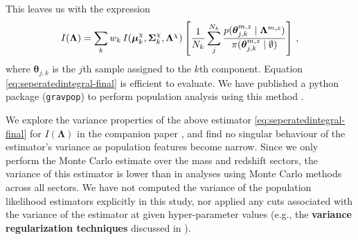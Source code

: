 \documentclass[twocolumn,usenames,dvipsnames,linenumbers]{aastex631}
\begin{document}
This leaves us with the expression
\begin{equation}
		I(\boldsymbol{\Lambda}) = \sum_k w_k \,
		I(\boldsymbol{\mu}^{\chi}_k, {\bf \Sigma}^{\chi}_k, \boldsymbol{\Lambda}^\chi)
		\left[\frac{1}{N_k}\sum_j^{N_k} \frac{p(\boldsymbol{\theta}_{j,k}^{m,z} \mid \boldsymbol{\Lambda}^{m,z})}{\pi(\boldsymbol{\theta}_{j,k}^{m,z} \mid \emptyset)}\right]\,,
		\label{eq:seperatedintegral-final}
\end{equation}
where $\boldsymbol{\theta}_{j,k}$ is the $j$th sample assigned to the $k$th component.
Equation \eqref{eq:seperatedintegral-final} is efficient to evaluate. We have published a python package (\texttt{gravpop}) to perform population analysis using this method \citep{gravpop}.

We explore the variance properties of the above estimator \eqref{eq:seperatedintegral-final} for $I(\boldsymbol{\Lambda})$ in the companion paper \cite{TGMM_Methods}, and find no singular behaviour of the estimator's variance as population features become narrow. 
Since we only perform the Monte Carlo estimate over the mass and redshift sectors, the variance of this estimator is lower than in analyses using Monte Carlo methods across all sectors. 
We have not computed the variance of the population likelihood estimators explicitly in this study, nor applied any cuts associated with the variance of the estimator at given hyper-parameter values (e.g., the \textbf{variance regularization techniques} discussed in \citealt{KAGRA:2021duu}).
\end{document}
